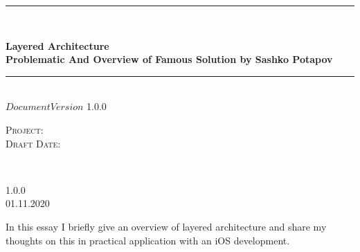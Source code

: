 \begin{titlepage}

	\centering
    \vspace*{0.5 cm}
	\rule{\linewidth}{0.2 mm} \\[0.4cm]
	\begin{spacing}{1.1}
		\huge \bfseries Layered Architecture\\[0.3cm]
		\LARGE Problematic And Overview of Famous Solution by Sashko Potapov
	\end{spacing}
	\rule{\linewidth}{0.2 mm} \\[1 cm]


	\textsc{\large $Document Version$ 1.0.0}\\[4cm]


 
	\vfill
	\noindent
	\begin{minipage}{0.7\textwidth}
		\begin{flushright}
			\textsc{Project:}\\
			\textsc{Draft Date:}\\
		\end{flushright}
	\end{minipage}~~\hspace*{1 cm}
	\begin{minipage}{0.3\textwidth}
		\begin{flushleft}
			1.0.0\\
			01.11.2020\\
		\end{flushleft}
	\end{minipage}

	\clearpage

	\setcounter{page}{1}
	\justifying
	In this essay I briefly give an overview of layered architecture and share my thoughts on this in practical application with an iOS development.
    \clearpage
	
    \setcounter{tocdepth}{3}
    \tableofcontents

    \clearpage

\end{titlepage}
